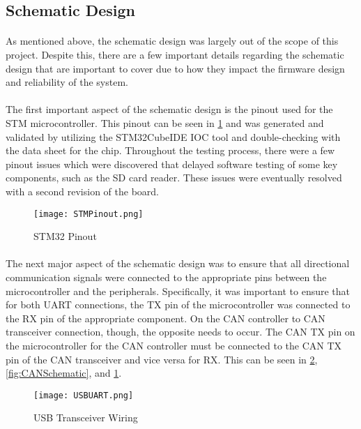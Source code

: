 \subsection{Schematic Design}

\paragraph{}
As mentioned above, the schematic design was largely out of the scope of this project.
Despite this, there are a few important details regarding the schematic design that are important to cover due to how they impact the firmware design and reliability of the system.

\paragraph{}
The first important aspect of the schematic design is the pinout used for the STM microcontroller.
This pinout can be seen in \cref{fig:STMIOC} and was generated and validated by utilizing the STM32CubeIDE IOC tool and double-checking with the data sheet for the chip.
Throughout the testing process, there were a few pinout issues which were discovered that delayed software testing of some key components, such as the SD card reader.
These issues were eventually resolved with a second revision of the board.

\begin{figure}[H]
	\centering
	\texttt{[image: STMPinout.png]}
	\caption{STM32 Pinout}
	\label{fig:STMIOC}
\end{figure}

\paragraph{}
The next major aspect of the schematic design was to ensure that all directional communication signals were connected to the appropriate pins between the microcontroller and the peripherals.
Specifically, it was important to ensure that for both UART connections, the TX pin of the microcontroller was connected to the RX pin of the appropriate component.
On the CAN controller to CAN transceiver connection, though, the opposite needs to occur.
The CAN TX pin on the microcontroller for the CAN controller must be connected to the CAN TX pin of the CAN transceiver and vice versa for RX.
This can be seen in \cref{fig:USBSchematic}, \cref{fig:CANSchematic}, and \cref{fig:STMIOC}.


\begin{figure}[H]
	\centering
	\texttt{[image: USBUART.png]}
	\caption{USB Transceiver Wiring}
	\label{fig:USBSchematic}
\end{figure}

